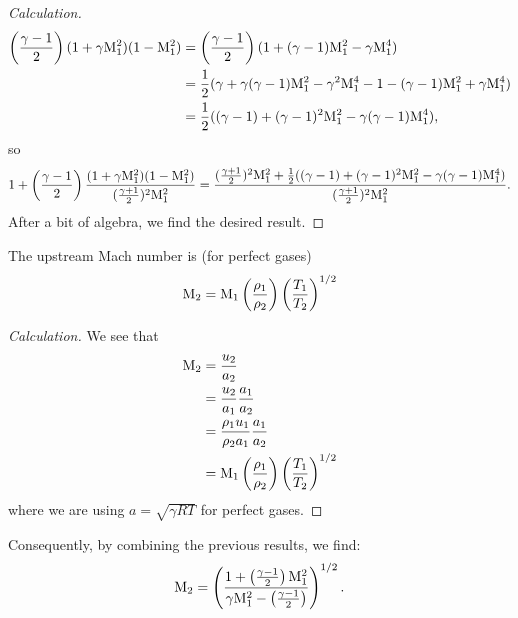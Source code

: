 \begin{proof}[Calculation]
\begin{subequations}
\begin{align}
\left(\frac{\gamma-1}{2}\right)(1 + \gamma\mathrm{M}_{1}^{2})(1 - \mathrm{M}_{1}^{2}) &= \left(\frac{\gamma-1}{2}\right)(1 + (\gamma-1)\mathrm{M}_{1}^{2} - \gamma\mathrm{M}_{1}^{4})\\
&=\frac{1}{2}(\gamma+\gamma(\gamma-1)\mathrm{M}_{1}^{2}-\gamma^{2}\mathrm{M}_{1}^{4}-1-(\gamma-1)\mathrm{M}_{1}^{2} + \gamma\mathrm{M}_{1}^{4})\\
&=\frac{1}{2}((\gamma-1)+(\gamma-1)^{2}\mathrm{M}_{1}^{2}-\gamma(\gamma-1)\mathrm{M}_{1}^{4}),
  \end{align}
\end{subequations}
so
\begin{equation}
1+\left(\frac{\gamma-1}{2}\right)\frac{(1+\gamma\mathrm{M}_{1}^{2})(1-\mathrm{M}_{1}^{2})}{(\frac{\gamma+1}{2})^{2}\mathrm{M}_{1}^{2}}
= \frac{(\frac{\gamma+1}{2})^{2}\mathrm{M}_{1}^{2}+\frac{1}{2}((\gamma-1)+(\gamma-1)^{2}\mathrm{M}_{1}^{2}-\gamma(\gamma-1)\mathrm{M}_{1}^{4})}{(\frac{\gamma+1}{2})^{2}\mathrm{M}_{1}^{2}}.
\end{equation}
After a bit of algebra, we find the desired result.
\end{proof}

\begin{node}
The upstream Mach number is (for perfect gases)
\begin{equation}
\mathrm{M}_{2} = \mathrm{M}_{1}\left(\frac{\rho_{1}}{\rho_{2}}\right)\left(\frac{T_{1}}{T_{2}}\right)^{1/2}
\end{equation}
\end{node}

\begin{proof}[Calculation]
We see that
\begin{subequations}
  \begin{align}
\mathrm{M}_{2} &= \frac{u_{2}}{a_{2}}\\
&= \frac{u_{2}}{a_{1}}\frac{a_{1}}{a_{2}}\\
&= \frac{\rho_{1}u_{1}}{\rho_{2}a_{1}}\frac{a_{1}}{a_{2}}\\
&=\mathrm{M}_{1}\left(\frac{\rho_{1}}{\rho_{2}}\right)\left(\frac{T_{1}}{T_{2}}\right)^{1/2}
  \end{align}
\end{subequations}
where we are using $a=\sqrt{\gamma RT}$ for perfect gases.
\end{proof}

\begin{node}
Consequently, by combining the previous results, we find:
\begin{equation}
\mathrm{M}_{2}=\left(\frac{1+\left(\frac{\gamma-1}{2}\right)\mathrm{M}_{1}^{2}}{\gamma\mathrm{M}_{1}^{2}-\left(\frac{\gamma-1}{2}\right)}\right)^{1/2}.
\end{equation}
\end{node}

